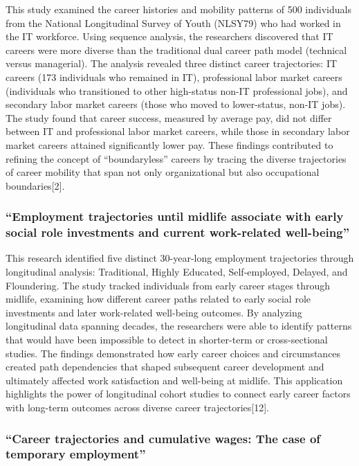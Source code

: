 \documentclass[
  letterpaper,
  DIV=11,
  numbers=noendperiod]{scrartcl}
\begin{document}
This study examined the career histories and mobility patterns of 500
individuals from the National Longitudinal Survey of Youth (NLSY79) who
had worked in the IT workforce. Using sequence analysis, the researchers
discovered that IT careers were more diverse than the traditional dual
career path model (technical versus managerial). The analysis revealed
three distinct career trajectories: IT careers (173 individuals who
remained in IT), professional labor market careers (individuals who
transitioned to other high-status non-IT professional jobs), and
secondary labor market careers (those who moved to lower-status, non-IT
jobs). The study found that career success, measured by average pay, did
not differ between IT and professional labor market careers, while those
in secondary labor market careers attained significantly lower pay.
These findings contributed to refining the concept of ``boundaryless''
careers by tracing the diverse trajectories of career mobility that span
not only organizational but also occupational boundaries{[}2{]}.

\subsubsection{``Employment trajectories until midlife associate with
early social role investments and current work-related
well-being''}\label{employment-trajectories-until-midlife-associate-with-early-social-role-investments-and-current-work-related-well-being}

This research identified five distinct 30-year-long employment
trajectories through longitudinal analysis: Traditional, Highly
Educated, Self-employed, Delayed, and Floundering. The study tracked
individuals from early career stages through midlife, examining how
different career paths related to early social role investments and
later work-related well-being outcomes. By analyzing longitudinal data
spanning decades, the researchers were able to identify patterns that
would have been impossible to detect in shorter-term or cross-sectional
studies. The findings demonstrated how early career choices and
circumstances created path dependencies that shaped subsequent career
development and ultimately affected work satisfaction and well-being at
midlife. This application highlights the power of longitudinal cohort
studies to connect early career factors with long-term outcomes across
diverse career trajectories{[}12{]}.

\subsubsection{``Career trajectories and cumulative wages: The case of
temporary
employment''}\label{career-trajectories-and-cumulative-wages-the-case-of-temporary-employment}
\end{document}
